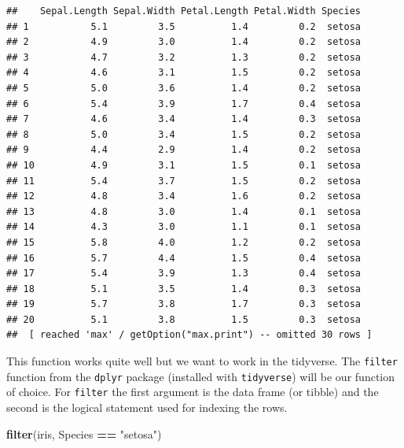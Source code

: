 \documentclass[
]{book}
\newenvironment{Shaded}{\begin{snugshade}}{\end{snugshade}}
\newcommand{\KeywordTok}[1]{\textcolor[rgb]{0.13,0.29,0.53}{\textbf{#1}}}
\newcommand{\NormalTok}[1]{#1}
\newcommand{\OperatorTok}[1]{\textcolor[rgb]{0.81,0.36,0.00}{\textbf{#1}}}
\newcommand{\StringTok}[1]{\textcolor[rgb]{0.31,0.60,0.02}{#1}}
\theoremstyle{definition}
\theoremstyle{definition}
\theoremstyle{definition}
\theoremstyle{remark}
\begin{document}
\begin{verbatim}
##    Sepal.Length Sepal.Width Petal.Length Petal.Width Species
## 1           5.1         3.5          1.4         0.2  setosa
## 2           4.9         3.0          1.4         0.2  setosa
## 3           4.7         3.2          1.3         0.2  setosa
## 4           4.6         3.1          1.5         0.2  setosa
## 5           5.0         3.6          1.4         0.2  setosa
## 6           5.4         3.9          1.7         0.4  setosa
## 7           4.6         3.4          1.4         0.3  setosa
## 8           5.0         3.4          1.5         0.2  setosa
## 9           4.4         2.9          1.4         0.2  setosa
## 10          4.9         3.1          1.5         0.1  setosa
## 11          5.4         3.7          1.5         0.2  setosa
## 12          4.8         3.4          1.6         0.2  setosa
## 13          4.8         3.0          1.4         0.1  setosa
## 14          4.3         3.0          1.1         0.1  setosa
## 15          5.8         4.0          1.2         0.2  setosa
## 16          5.7         4.4          1.5         0.4  setosa
## 17          5.4         3.9          1.3         0.4  setosa
## 18          5.1         3.5          1.4         0.3  setosa
## 19          5.7         3.8          1.7         0.3  setosa
## 20          5.1         3.8          1.5         0.3  setosa
##  [ reached 'max' / getOption("max.print") -- omitted 30 rows ]
\end{verbatim}

This function works quite well but we want to work in the tidyverse. The \texttt{filter} function from the \texttt{dplyr} package (installed with \texttt{tidyverse}) will be our function of choice. For \texttt{filter} the first argument is the data frame (or tibble) and the second is the logical statement used for indexing the rows.

\begin{Shaded}
\begin{Highlighting}[]
\KeywordTok{filter}\NormalTok{(iris, Species }\OperatorTok{==}\StringTok{ "setosa"}\NormalTok{)}
\end{Highlighting}
\end{Shaded}
\end{document}
